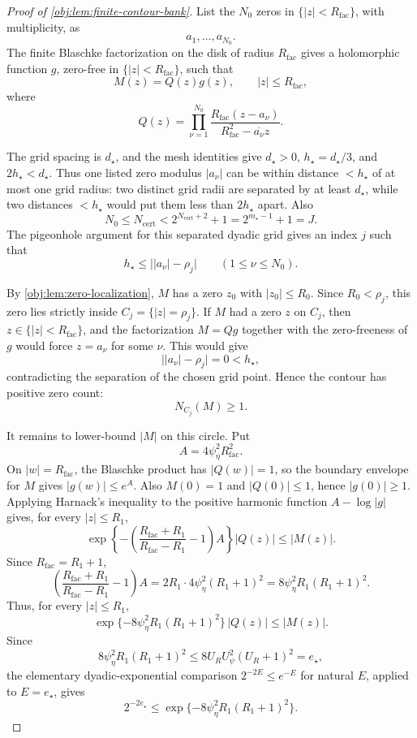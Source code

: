 \begin{proof}[Proof of \cref{obj:lem:finite-contour-bank}]
List the \(N_0\) zeros in \(\{|z|<R_{\mathrm{fac}}\}\), with multiplicity, as
\[
a_1,\ldots,a_{N_0}.
\]
The finite Blaschke factorization on the disk of radius \(R_{\mathrm{fac}}\) gives a holomorphic function \(g\), zero-free in \(\{|z|<R_{\mathrm{fac}}\}\), such that
\[
M(z)=Q(z)g(z),\qquad |z|\le R_{\mathrm{fac}},
\]
where
\[
Q(z)=
\prod_{\nu=1}^{N_0}
\frac{R_{\mathrm{fac}}(z-a_\nu)}
     {R_{\mathrm{fac}}^2-\overline{a_\nu}z}.
\]

The grid spacing is \(d_\star\), and the mesh identities give \(d_\star>0\), \(h_\star=d_\star/3\), and \(2h_\star<d_\star\).  Thus one listed zero modulus \(|a_\nu|\) can be within distance \(<h_\star\) of at most one grid radius: two distinct grid radii are separated by at least \(d_\star\), while two distances \(<h_\star\) would put them less than \(2h_\star\) apart.  Also
\[
N_0\le N_{\mathrm{cert}}<2^{N_{\mathrm{cert}}+2}+1
=2^{m_\star-1}+1=J.
\]
The pigeonhole argument for this separated dyadic grid gives an index \(j\) such that
\[
h_\star\le \bigl||a_\nu|-\rho_j\bigr|
\qquad (1\le \nu\le N_0).
\]

By \cref{obj:lem:zero-localization}, \(M\) has a zero \(z_0\) with \(|z_0|\le R_0\).  Since \(R_0<\rho_j\), this zero lies strictly inside \(C_j=\{|z|=\rho_j\}\).  If \(M\) had a zero \(z\) on \(C_j\), then \(z\in\{|z|<R_{\mathrm{fac}}\}\), and the factorization \(M=Qg\) together with the zero-freeness of \(g\) would force \(z=a_\nu\) for some \(\nu\).  This would give
\[
\bigl||a_\nu|-\rho_j\bigr|=0<h_\star,
\]
contradicting the separation of the chosen grid point.  Hence the contour has positive zero count:
\[
N_{C_j}(M)\ge1.
\]

It remains to lower-bound \(|M|\) on this circle.  Put
\[
A=4\psi_\eta^2R_{\mathrm{fac}}^2.
\]
On \(|w|=R_{\mathrm{fac}}\), the Blaschke product has \(|Q(w)|=1\), so the boundary envelope for \(M\) gives \(|g(w)|\le e^A\).  Also \(M(0)=1\) and \(|Q(0)|\le1\), hence \(|g(0)|\ge1\).  Applying Harnack's inequality to the positive harmonic function \(A-\log|g|\) gives, for every \(|z|\le R_1\),
\[
\exp\!\left\{-\left(\frac{R_{\mathrm{fac}}+R_1}{R_{\mathrm{fac}}-R_1}-1\right)A\right\}|Q(z)|
\le |M(z)|.
\]
Since \(R_{\mathrm{fac}}=R_1+1\),
\[
\left(\frac{R_{\mathrm{fac}}+R_1}{R_{\mathrm{fac}}-R_1}-1\right)A
=2R_1\cdot 4\psi_\eta^2(R_1+1)^2
=8\psi_\eta^2R_1(R_1+1)^2.
\]
Thus, for every \(|z|\le R_1\),
\[
\exp\{-8\psi_\eta^2R_1(R_1+1)^2\}\,|Q(z)|
\le |M(z)|.
\]
Since
\[
8\psi_\eta^2R_1(R_1+1)^2\le
8U_RU_\psi^2(U_R+1)^2=e_\star,
\]
the elementary dyadic-exponential comparison \(2^{-2E}\le e^{-E}\) for natural \(E\), applied to \(E=e_\star\), gives
\[
2^{-2e_\star}
\le \exp\{-8\psi_\eta^2R_1(R_1+1)^2\}.
\]


\end{proof}

